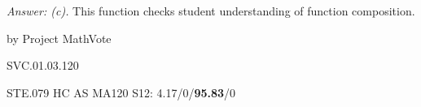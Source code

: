 {\it Answer:  (c).}  This function checks student understanding of function composition.

\medskip
by Project MathVote

SVC.01.03.120

STE.079
HC AS MA120 S12: 4.17/0/{\bf95.83}/0  \\
